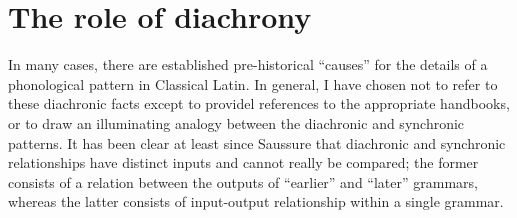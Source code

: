 
\section{The role of diachrony}

In many cases, there are established pre-historical ``causes'' for the details of a phonological pattern in Classical Latin.
In general, I have chosen not to refer to these diachronic facts except to providel references to the appropriate handbooks, or to draw an illuminating analogy between the diachronic and synchronic patterns.
It has been clear at least since Saussure that diachronic and synchronic relationships have distinct inputs and cannot really be compared; the former consists of a relation between the outputs of ``earlier'' and ``later'' grammars, whereas the latter consists of input-output relationship within a single grammar.
